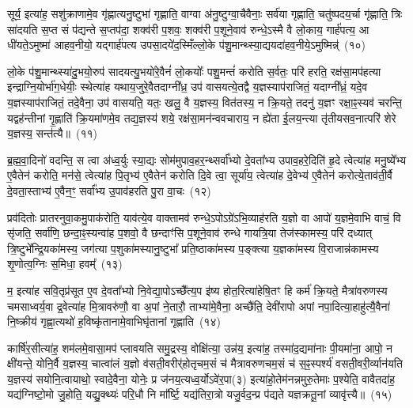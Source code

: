 सूर्य॒ इत्या॑ह॒ सशु॑क्राणामे॒व गृ॑ह्णात्यनु॒ष्टुभा॑ गृह्णाति॒ वाग्वा अ॑नु॒ष्टुग्वा॒चैवैनाः॒ सर्व॑या गृह्णाति॒ चतु॑ष्पदय॒र्चा गृ॑ह्णाति॒ त्रिः सा॑दयति स॒प्त सं प॑द्यन्ते स॒प्तप॑दा॒ शक्व॑री प॒शवः॒ शक्व॑री प॒शूने॒वाव॑ रुन्धे॒\-ऽस्मै वै लो॒काय॒ गार्\mbox{}ह॑पत्य॒ आ धी॑यते॒\-ऽमुष्मा॑ आहव॒नीयो॒ यद्गार्\mbox{}ह॑पत्य उपसा॒दये॑द॒स्मिँल्लो॒के प॑शु॒मान्थ्स्या॒द्ययदा॑हव॒नीये॒\-ऽमुष्मिन्न्॑~(१०)\ip

लो॒के प॑शु॒मान्थ्स्या॑दु॒भयो॒रुप॑ सादयत्यु॒भयो॑रे॒वैनं॑ लो॒कयोः᳚ पशु॒मन्तं॑ करोति स॒र्वतः॒ परि॑ हरति॒ रक्ष॑सा॒मप॑हत्या इन्द्राग्नि॒योर्भा॑ग॒धेयीः॒ स्थेत्या॑ह यथाय॒जुरे॒वैतदाग्नी᳚ध्र॒ उप॑ वासयत्ये॒तद्वै य॒ज्ञस्याप॑राजितं॒ यदाग्नी᳚ध्रं॒ यदे॒व य॒ज्ञस्याप॑राजितं॒ तदे॒वैना॒ उप॑ वासयति॒ यतः॒ खलु॒ वै य॒ज्ञस्य॒ वित॑तस्य॒ न क्रि॒यते॒ तदनु॑ य॒ज्ञꣳ रक्षा॒ꣴ॒स्यव॑ चरन्ति॒ यद्वह॑न्तीनां गृ॒ह्णाति॑ क्रि॒यमा॑णमे॒व तद्य॒ज्ञस्य॑ शये॒ रक्ष॑सा॒मन॑न्ववचाराय॒ न ह्ये॑ता ई॒लय॒न्त्या तृ॑तीय\-सव॒नात्परि॑ शेरे य॒ज्ञस्य॒ सन्त॑त्यै॥~(११)\ip

{\anuvakamend[{स्या॒दिन्द्रो॑ गृह्णी॒याद॑स्त्व॒मुष्मि॑न्क्रि॒यते॒ षड्विꣳ॑शतिश्च}]}

ब्र॒ह्म॒वा॒दिनो॑ वदन्ति॒ स त्वा अ॑ध्व॒र्युः स्या॒द्यः सोम॑मुपाव॒हर॒न्थ्सर्वा᳚भ्यो दे॒वता᳚भ्य उपाव॒हरे॒दिति॑ हृ॒दे त्वेत्या॑ह मनु॒ष्ये᳚भ्य ए॒वैतेन॑ करोति॒ मन॑से॒ त्वेत्या॑ह पि॒तृभ्य॑ ए॒वैतेन॑ करोति दि॒वे त्वा॒ सूर्या॑य॒ त्वेत्या॑ह दे॒वेभ्य॑ ए॒वैतेन॑ करोत्ये॒ताव॑ती॒र्वै दे॒वता॒स्ताभ्य॑ ए॒वैन॒ꣳ॒ सर्वा᳚भ्य उ॒पाव॑हरति पु॒रा वा॒चः~(१२)\ip

प्रव॑दितोः प्रातरनुवा॒कमु॒पा\-क॑रोति॒ याव॑त्ये॒व वाक्तामव॑ रुन्धे॒\-ऽपो\-ऽग्रे॑\-ऽभि॒व्याह॑रति य॒ज्ञो वा आपो॑ य॒ज्ञमे॒वाभि वाचं॒ वि सृ॑जति॒ सर्वा॑णि॒ छन्दा॒ꣴ॒स्यन्वा॑ह प॒शवो॒ वै छन्दाꣳ॑सि प॒शूने॒वाव॑ रुन्धे गायत्रि॒या तेज॑स्कामस्य॒ परि॑ दध्यात् त्रि॒ष्टुभे᳚न्द्रि॒यका॑मस्य॒ जग॑त्या प॒शुका॑मस्यानु॒ष्टुभा᳚ प्रति॒ष्ठाका॑मस्य प॒ङ्क्त्या य॒ज्ञका॑मस्य वि॒राजान्न॑कामस्य शृ॒णोत्व॒ग्निः स॒मिधा॒ हवम्᳚~(१३)\ip

म॒ इत्या॑ह सवि॒तृप्र॑सूत ए॒व दे॒वता᳚भ्यो नि॒वेद्या॒पो\-ऽच्छै᳚त्य॒प इ॑ष्य होत॒रित्या॑हेषि॒तꣳ हि कर्म॑ क्रि॒यते॒ मैत्रा॑वरुणस्य चमसाध्वर्य॒वा द्र॒वेत्या॑ह मि॒त्रावरु॑णौ॒ वा अ॒पां ने॒तारौ॒ ताभ्या॑मे॒वैना॒ अच्छै॑ति॒ देवी॑रापो अपां नपा॒दित्या॒हाहु॑त्यै॒वैना॑ नि॒ष्क्रीय॑ गृह्णा॒त्यथो॑ ह॒विष्कृ॑तानामे॒वाभिघृ॑तानां गृह्णाति~(१४)\ip

कार्\mbox{}षि॑र॒सीत्या॑ह॒ शम॑लमे॒वासा॒मप॑ प्लावयति समु॒द्रस्य॒ वोक्षि॑त्या॒ उन्न॑य॒ इत्या॑ह॒ तस्मा॑द॒द्यमा॑नाः पी॒यमा॑ना॒ आपो॒ न क्षी॑यन्ते॒ योनि॒र्वै य॒ज्ञस्य॒ चात्वा॑लं य॒ज्ञो व॑सती॒वरीर्॑\mbox{}होतृचम॒सं च॑ मैत्रावरुणचम॒सं च॑ स॒ꣴ॒स्पर्श्य॑ वसती॒वरी॒र्व्यान॑यति य॒ज्ञस्य॑ सयोनि॒त्वायाथो॒ स्वादे॒वैना॒ योनेः॒ प्र ज॑नय॒त्यध्व॒र्यो\-ऽवे॑र॒पा(३) इत्या॑हो॒तेम॑नन्नमुरु॒तेमाः प॒श्येति॒ वावैतदा॑ह॒ यद्य॑ग्निष्टो॒मो जु॒होति॒ यद्यु॒क्थ्यः॑ परि॒धौ नि मा᳚र्ष्टि॒ यद्य॑तिरा॒त्रो यजु॒र्वद॒न्प्र प॑द्यते यज्ञक्रतू॒नां व्यावृ॑त्त्यै॥~(१५)\ip

